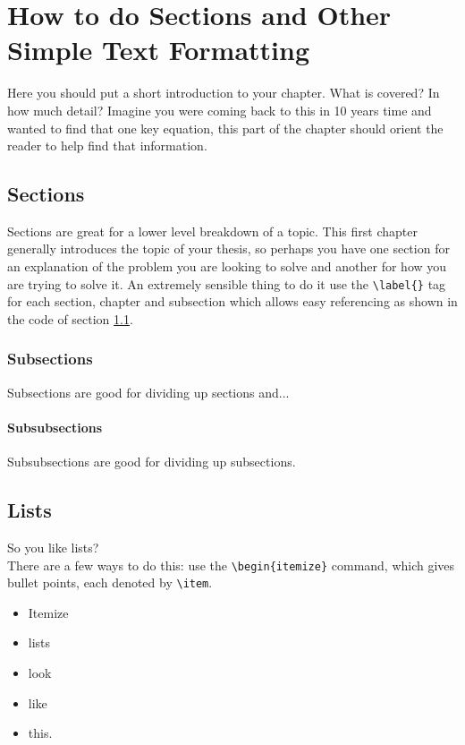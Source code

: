 \chapter{How to do Sections and Other Simple Text Formatting}
Here you should put a short introduction to your chapter. What is covered? In how much detail? Imagine you were coming back to this in 10 years time and wanted to find that one key equation, this part of the chapter should orient the reader to help find that information.

\section{Sections} \label{sec:sections}

Sections are great for a lower level breakdown of a topic. This first chapter generally introduces the topic of your thesis, so perhaps you have one section for an explanation of the problem you are looking to solve and another for how you are trying to solve it. An extremely sensible thing to do it use the \verb+\label{}+ tag for each section, chapter and subsection which allows easy referencing as shown in the code of section \ref{sec:sections}. %

\subsection{Subsections}
Subsections are good for dividing up sections and...

\subsubsection{Subsubsections}
Subsubsections are good for dividing up subsections.

\section{Lists}
So you like lists?\\
There are a few ways to do this: use the \verb+\begin{itemize}+ command, which gives bullet points, each denoted by \verb+\item+.
\begin{itemize}
    \item Itemize
    \item lists
    \item look
    \item like
    \item this.
\end{itemize}
 
